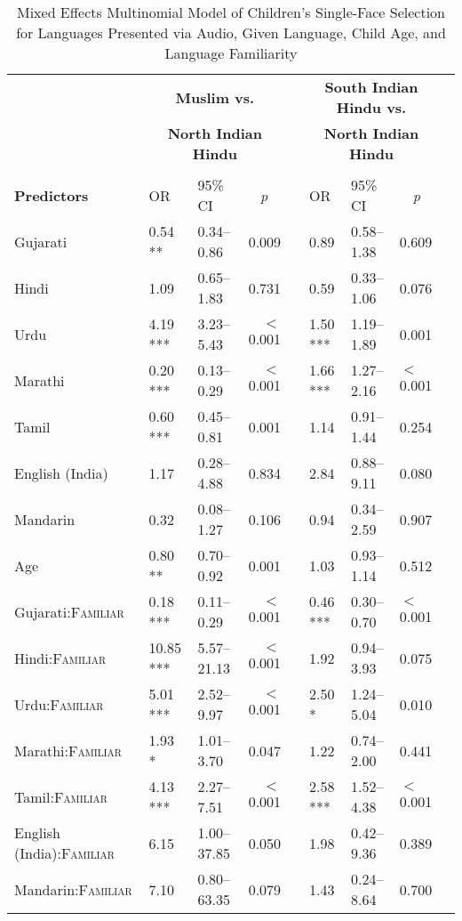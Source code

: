 \begin{table}[ht]
\small
\caption{Mixed Effects Multinomial Model of Children's Single-Face Selection for Languages Presented via Audio, Given Language, Child Age, and Language Familiarity}\label{tab:faimod}
    \centering
    \vspace{5pt}
    \setlength{\tabcolsep}{1.75pt} 
\begin{threeparttable}
\begin{tabular}{lllrllllr}
  \toprule
& \multicolumn{3}{c}{\textbf{Muslim vs.}} & & \multicolumn{3}{c}{\textbf{South Indian Hindu vs.}}\\
& \multicolumn{3}{c}{\textbf{North Indian Hindu}\tnote{a}} & & \multicolumn{3}{c}{\textbf{North Indian Hindu}\tnote{a}}\\
\cline{2-4} \cline{6-8} \\[-.75em]
\textbf{Predictors} & OR & 95\% CI & \multicolumn{1}{c}{\textit{p}} & & OR & 95\% CI & \multicolumn{1}{c}{\textit{p}} \\ 
\midrule
Gujarati & 0.54 ** & 0.34--0.86 & 0.009 &  & 0.89 & 0.58--1.38 & 0.609 \\ 
Hindi & 1.09 & 0.65--1.83 & 0.731 &  & 0.59 & 0.33--1.06 & 0.076 \\ 
Urdu & 4.19 *** & 3.23--5.43 & $<$0.001 &  & 1.50 *** & 1.19--1.89 & 0.001 \\ 
Marathi & 0.20 *** & 0.13--0.29 & $<$0.001 &  & 1.66 *** & 1.27--2.16 & $<$0.001 \\ 
Tamil & 0.60 *** & 0.45--0.81 & 0.001 &  & 1.14 & 0.91--1.44 & 0.254 \\ 
English (India) & 1.17 & 0.28--4.88 & 0.834 &  & 2.84 & 0.88--9.11 & 0.080 \\ 
Mandarin & 0.32 & 0.08--1.27 & 0.106 &  & 0.94 & 0.34--2.59 & 0.907 \\ 
Age\tnote{b} & 0.80 ** & 0.70--0.92 & 0.001 &  & 1.03 & 0.93--1.14 & 0.512 \\ 
Gujarati:\textsc{Familiar} & 0.18 *** & 0.11--0.29 & $<$0.001 &  & 0.46 *** & 0.30--0.70 & $<$0.001 \\ 
Hindi:\textsc{Familiar} & 10.85 *** & 5.57--21.13 & $<$0.001 &  & 1.92 & 0.94--3.93 & 0.075 \\ 
Urdu:\textsc{Familiar} & 5.01 *** & 2.52--9.97 & $<$0.001 &  & 2.50 * & 1.24--5.04 & 0.010 \\ 
Marathi:\textsc{Familiar} & 1.93 * & 1.01--3.70 & 0.047 &  & 1.22 & 0.74--2.00 & 0.441 \\ 
Tamil:\textsc{Familiar} & 4.13 *** & 2.27--7.51 & $<$0.001 &  & 2.58 *** & 1.52--4.38 & $<$0.001 \\ 
English (India):\textsc{Familiar} & 6.15 & 1.00--37.85 & 0.050 &  & 1.98 & 0.42--9.36 & 0.389 \\ 
Mandarin:\textsc{Familiar} & 7.10 & 0.80--63.35 & 0.079 &  & 1.43 & 0.24--8.64 & 0.700 \\ 


\end{tabular}
\end{threeparttable}
\end{table}
